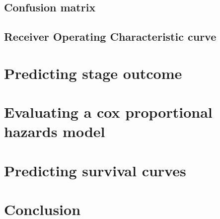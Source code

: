 \subsection{Confusion matrix}
\subsection{Receiver Operating Characteristic curve}
\section{Predicting stage outcome}
\label{sec:evaluation-predictingstage}
\section{Evaluating a cox proportional hazards model}
\label{sec:evaluation-coxph}
\section{Predicting survival curves}
\label{sec:evaluation-predictingsurvival}
\section{Conclusion}
\label{sec:evaluation-conclusion}
